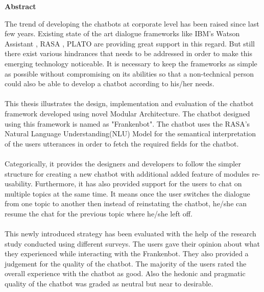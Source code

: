 \thispagestyle{empty}
\vspace*{1.0cm}

\begin{center}
    \textbf{Abstract}
\end{center}

\vspace*{0.5cm}

\noindent
The trend of developing the chatbots at corporate level has been raised since last few years. Existing state of the art dialogue frameworks like IBM's Watson Assistant \cite{ibmwatson}, RASA \cite{rasa}, PLATO \cite{plato} are providing great support in this regard. But still there exist various hindrances that needs to be addressed in order to make this emerging technology noticeable. It is necessary to keep the frameworks as simple as possible without compromising on its abilities so that a non-technical person could also be able to develop a chatbot according to his/her needs.
\\~\\
This thesis illustrates the design, implementation and evaluation of the chatbot framework developed using novel Modular Architecture. The chatbot designed using this framework is named as "Frankenbot". The chatbot uses the RASA's Natural Language Understanding(NLU) Model for the semantical interpretation of the users utterances in order to fetch the required fields for the chatbot. 
\\~\\
Categorically, it provides the designers and developers to follow the simpler structure for creating a new chatbot with additional added feature of modules re-usability. Furthermore, it has also provided support for the users to chat on multiple topics at the same time. It means once the user switches the dialogue from one topic to another then instead of reinstating the chatbot, he/she can resume the chat for the previous topic where he/she left off.
\\~\\
This newly introduced strategy has been evaluated with the help of the research study conducted using different surveys. The users gave their opinion about what they experienced while interacting with the Frankenbot. They also provided a judgement for the quality of the chatbot. The majority of the users rated the overall experience with the chatbot as good. Also the hedonic and pragmatic quality of the chatbot was graded as neutral but near to desirable.

 
 


